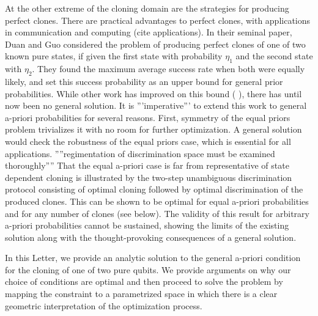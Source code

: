 \documentclass[aps,prl,twocolumn,showpacs]{revtex4}
\begin{document}
 At the other extreme of the cloning domain are the strategies for producing perfect clones. There are practical advantages to perfect clones, with applications in communication and computing (cite applications).  In their seminal paper, Duan and Guo \cite{DuanGuo} considered the problem of producing perfect clones of one of two known pure states, if given the first state with probability $\eta_1$ and the second state with $\eta_2$.  They found the maximum average success rate when both were equally likely, and set this success probability as an upper bound for general prior probabilities.  While other work has improved on this bound ( ), there has until now been no general solution.  It is '''imperative''' to extend this work to general a-priori probabilities for several reasons.  First, symmetry of the equal priors problem trivializes it with no room for further optimization.  A general solution would check the robustness of the equal priors case, which is essential for all applications.  
''''regimentation of discrimination space must be examined thoroughly''''
That the equal a-priori case is far from representative of state dependent cloning is illustrated by the two-step unambiguous discrimination protocol consisting of optimal cloning followed by optimal discrimination of the produced clones. This can be shown to be optimal for equal a-priori probabilities and for any number of clones (see below). The validity of this result for arbitrary a-priori probabilities cannot be sustained, showing the limits of the existing solution along with the thought-provoking consequences of a general solution.


In this Letter, we provide an analytic solution to the general a-priori condition for the cloning of one of two pure qubits.  We provide arguments on why our choice of conditions are optimal and then proceed to solve the problem by mapping the constraint to a parametrized space in which there is a clear geometric interpretation of the optimization process.

\end{document}
